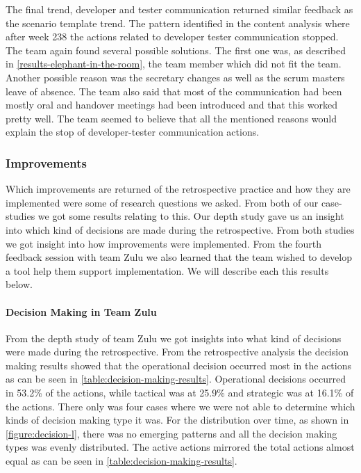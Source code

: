 The final trend, developer and tester communication returned similar feedback as the scenario template trend. The pattern identified in the content analysis where after week 238 the actions related to developer tester communication stopped. The team again found several possible solutions. The first one was, as described in \autoref{results-elephant-in-the-room}, the team member which did not fit the team. Another possible reason was the secretary changes as well as the scrum masters leave of absence. The team also said that most of the communication had been mostly oral and handover meetings had been introduced and that this worked pretty well. The team seemed to believe that all the mentioned reasons would explain the stop of developer-tester communication actions. 

\subsubsection{Improvements}
Which improvements are returned of the retrospective practice and how they are implemented were some of research questions we asked. From both of our case-studies we got some results relating to this. Our depth study gave us an insight into which kind of decisions are made during the retrospective. From both studies we got insight into how improvements were implemented. From the fourth feedback session with team Zulu we also learned that the team wished to develop a tool help them support implementation. We will describe each this results below.

\paragraph{Decision Making in Team Zulu}
From the depth study of team Zulu we got insights into what kind of decisions were made during the retrospective. From the retrospective analysis the decision making results showed that the operational decision occurred most in the actions as can be seen in \autoref{table:decision-making-results}. Operational decisions occurred in 53.2\% of the actions, while tactical was at 25.9\% and strategic was at 16.1\% of the actions. There only was four cases where we were not able to determine which kinds of decision making type it was. For the distribution over time, as shown in \autoref{figure:decision-l}, there was no emerging patterns and all the decision making types was evenly distributed. The active actions mirrored the total actions almost equal as can be seen in \autoref{table:decision-making-results}.

